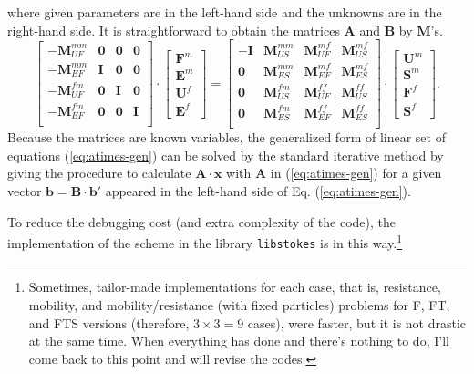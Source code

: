 \documentclass{book}
\begin{document}
where given parameters are in the left-hand side
and the unknowns are in the right-hand side.
It is straightforward to obtain the matrices $\bm{A}$ and $\bm{B}$
by $\bm{M}$'s.
\begin{equation}
  \left[
    \begin{array}{cccc}
      -\bm{M}_{UF}^{mm} & \bm{0} & \bm{0} & \bm{0}\\
      -\bm{M}_{EF}^{mm} & \bm{I} & \bm{0} & \bm{0}\\
      -\bm{M}_{UF}^{fm} & \bm{0} & \bm{I} & \bm{0}\\
      -\bm{M}_{EF}^{fm} & \bm{0} & \bm{0} & \bm{I}\\
    \end{array}
  \right]
  \cdot
  \left[
    \begin{array}{c}
      \bm{F}^{m}\\
      \bm{E}^{m}\\
      \bm{U}^{f}\\
      \bm{E}^{f}
    \end{array}
  \right]
  =
  \left[
    \begin{array}{cccc}
      -\bm{I} & \bm{M}_{US}^{mm} & \bm{M}_{UF}^{mf} & \bm{M}_{US}^{mf}\\
      \bm{0}  & \bm{M}_{ES}^{mm} & \bm{M}_{EF}^{mf} & \bm{M}_{ES}^{mf}\\
      \bm{0}  & \bm{M}_{US}^{fm} & \bm{M}_{UF}^{ff} & \bm{M}_{US}^{ff}\\
      \bm{0}  & \bm{M}_{ES}^{fm} & \bm{M}_{EF}^{ff} & \bm{M}_{ES}^{ff}\\
    \end{array}
  \right]
  \cdot
  \left[
    \begin{array}{c}
      \bm{U}^{m}\\
      \bm{S}^{m}\\
      \bm{F}^{f}\\
      \bm{S}^{f}
    \end{array}
  \right]
  .
\end{equation}
Because the matrices are known variables,
the generalized form of linear set of equations (\ref{eq:atimes-gen})
can be solved by the standard iterative method
by giving the procedure to calculate $\bm{A}\cdot\bm{x}$
with $\bm{A}$ in (\ref{eq:atimes-gen})
for a given vector $\bm{b} = \bm{B}\cdot\bm{b}'$
appeared in the left-hand side of Eq. (\ref{eq:atimes-gen}).


To reduce the debugging cost (and extra complexity of the code),
the implementation of the scheme in the library {\tt libstokes}
is in this way.\footnote{
  Sometimes, tailor-made implementations for each case,
  that is, resistance, mobility, and mobility/resistance
  (with fixed particles) problems for F, FT, and FTS versions
  (therefore, $3\times 3 = 9$ cases), were faster,
  but it is not drastic at the same time.
  When everything has done and there's nothing to do,
  I'll come back to this point and will revise the codes.}
\end{document}
